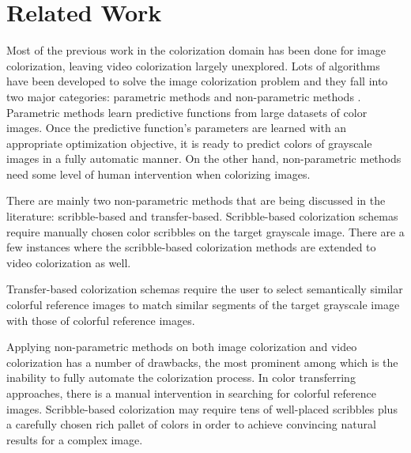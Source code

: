 \documentclass[10pt,twocolumn,letterpaper]{article}
\begin{document}
\section{Related Work}

Most of the previous work in the colorization domain has been done for image colorization, leaving video colorization largely unexplored. Lots of algorithms have been developed to solve the image colorization problem and they fall into two major categories: parametric methods \cite{DBLP:journals/corr/abs-1712-03400, DBLP:journals/corr/ChengYS16, 7410429, Iizuka:2016:LCJ:2897824.2925974, DBLP:journals/corr/LarssonMS16, DBLP:journals/corr/ZhangIE16, DBLP:journals/corr/ZhangZIGLYE17} and non-parametric methods \cite{10.1007/978-3-540-88690-7_10, Chia:2011:SCI:2070781.2024190, Gupta:2012:ICU:2393347.2393402, Huang:2005:AED:1101149.1101223, Irony:2005:CE:2383654.2383683, Levin:2004:CUO:1015706.1015780, Luan:2007:NIC:2383847.2383887, Morimoto:2009:ACG:1599301.1599333, qu-2006-manga, 1467343, Welsh:2002:TCG:566654.566576, 1621234}. Parametric methods learn predictive functions from large datasets of color images. Once the predictive function's parameters are learned with an appropriate optimization objective, it is ready to predict colors of grayscale images in a fully automatic manner. On the other hand, non-parametric methods need some level of human intervention when colorizing images.  

There are mainly two non-parametric methods that are being discussed in the literature: scribble-based and transfer-based. Scribble-based colorization schemas \cite{Huang:2005:AED:1101149.1101223, Levin:2004:CUO:1015706.1015780, Luan:2007:NIC:2383847.2383887, qu-2006-manga, 1621234} require manually chosen color scribbles on the target grayscale image. There are a few instances where the scribble-based colorization methods are extended to video colorization as well. 

Transfer-based colorization schemas \cite{10.1007/978-3-540-88690-7_10, Chia:2011:SCI:2070781.2024190, Gupta:2012:ICU:2393347.2393402, Irony:2005:CE:2383654.2383683, Morimoto:2009:ACG:1599301.1599333, 1467343, Welsh:2002:TCG:566654.566576} require the user to select semantically similar colorful reference images to match similar segments of the target grayscale image with those of colorful reference images. 

Applying non-parametric methods on both image colorization and video colorization has a number of drawbacks, the most prominent among which is the inability to fully automate the colorization process. In color transferring approaches, there is a manual intervention in searching for colorful reference images. Scribble-based colorization may require tens of well-placed scribbles plus a carefully chosen rich pallet of colors in order to achieve convincing natural results for a complex image.  
\end{document}

